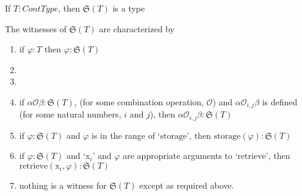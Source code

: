 \begin{ex} 
\begin{subex} 
 
\item If $T:\textit{ContType}$, then $\mathfrak{S}(T)$ is a type 
 
\item The witnesses of $\mathfrak{S}(T)$ are characterized by
  \begin{enumerate} 
 
  \item if $\varphi:T$ then $\varphi:\mathfrak{S}(T)$
    
  \item {}
    
  \item {}

    
  \item if $\alpha\mathcal{O}\beta:\mathfrak{S}(T)$, (for
      some combination operation, $\mathcal{O}$) and
      $\alpha\mathcal{O}_{i,j}\beta$ is defined (for some natural
      numbers, $i$ and $j$), then $\alpha\mathcal{O}_{i,j}\beta:\mathfrak{S}(T)$
 
  \item if $\varphi:\mathfrak{S}(T)$ and $\varphi$ is in the range of `$\mathrm{storage}$', then
    $\mathrm{storage}(\varphi):\mathfrak{S}(T)$

  \item if $\varphi:\mathfrak{S}(T)$ and `x$_i$' and $\varphi$ are appropriate
    arguments to `$\mathrm{retrieve}$', then
    $\mathrm{retrieve}(\text{x}_i,\varphi):\mathfrak{S}(T)$
    
  \item nothing is a witness for $\mathfrak{S}(T)$ except as required above.
 
  \end{enumerate} 
  
 
\end{subex} 
\label{ex:storage-donkey-type}   
\end{ex}



